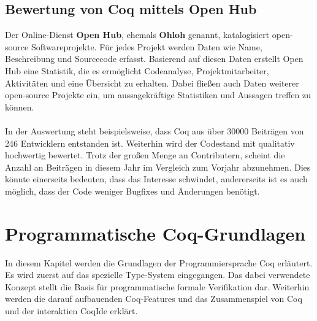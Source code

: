 \subsection{Bewertung von Coq mittels Open Hub}
Der Online-Dienst \textbf{Open Hub}, ehemals \textbf{Ohloh} genannt, katalogisiert open-source Softwareprojekte. Für jedes Projekt werden Daten wie Name, Beschreibung und Sourcecode erfasst. Basierend auf diesen Daten erstellt Open Hub eine Statistik, die es ermöglicht Codeanalyse, Projektmitarbeiter, Aktivitäten und eine Übersicht zu erhalten. Dabei fließen auch Daten weiterer open-source Projekte ein, um aussagekräftige Statistiken und Aussagen treffen zu können.\\
\\
{In der Auswertung steht beispielsweise, dass Coq aus über 30000 Beiträgen von 246 Entwicklern entstanden ist. Weiterhin wird der Codestand mit qualitativ hochwertig bewertet. Trotz der großen Menge an Contributern, scheint die Anzahl an Beiträgen in diesem Jahr im Vergleich zum Vorjahr abzunehmen. Dies könnte einerseits bedeuten, dass das Interesse schwindet, andererseits ist es auch möglich, dass der Code weniger Bugfixes und Änderungen benötigt.}\cite{OH01:FV}\\

\section{Programmatische Coq-Grundlagen}
In diesem Kapitel werden die Grundlagen der Programmiersprache Coq erläutert. Es wird zuerst auf das spezielle Type-System eingegangen. Das dabei verwendete Konzept stellt die Basis für programmatische formale Verifikation dar. Weiterhin werden die darauf aufbauenden Coq-Features und das Zusammenspiel von Coq und der interaktien CoqIde erklärt.\\

